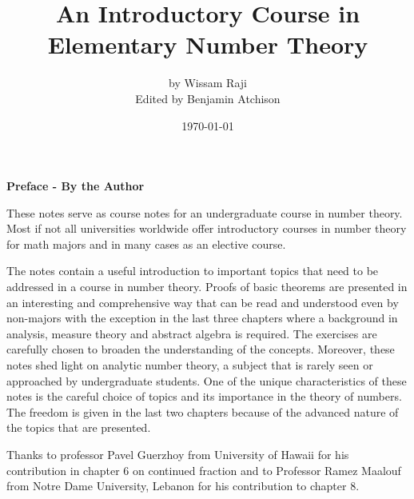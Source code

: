 \documentclass[12pt,letterpaper]{book}
\title{An Introductory Course in Elementary Number Theory}
\author{by Wissam Raji\\ \small{Edited by Benjamin Atchison}}
\date{\today}
\begin{document}
\maketitle
{}

\begin{center}\textbf{Preface - By the Author}
\end{center}\par These notes serve as course notes for
an undergraduate course in number theory.  Most if not all
universities worldwide offer introductory courses in number theory
for math majors and in many cases as an elective course.

\par The notes contain a useful introduction to important topics that need to be addressed in a course in number theory. Proofs of basic theorems
are presented in an interesting and comprehensive way that can be
read and understood even by non-majors with the exception in the
last three chapters where a background in analysis, measure theory
and abstract algebra is required. The exercises are carefully chosen
to broaden the understanding of the concepts.  Moreover, these notes
shed light on analytic number theory, a subject that is rarely seen
or approached by undergraduate students. One of the unique
characteristics of these notes is the careful choice of topics and
its importance in the theory of numbers. The freedom is given in the
last two chapters because of the advanced nature of the topics that
are presented.

Thanks to professor Pavel Guerzhoy from University of Hawaii for his
contribution in chapter 6 on continued fraction and to Professor
Ramez Maalouf from Notre Dame University, Lebanon for his
contribution to chapter 8.%
  
	\newpage
	
\end{document}
